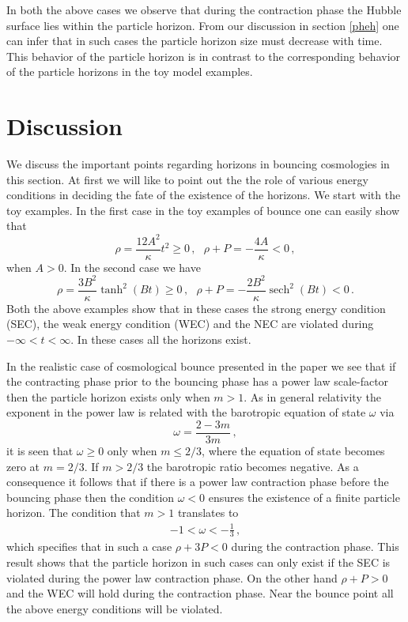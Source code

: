 \documentclass[24pt]{article}
\DeclareMathOperator{\sech}{sech}
\begin{document}
In both the above cases we observe that during the contraction phase
the Hubble surface lies within the particle horizon. From our
discussion in section \ref{pheh} one can infer that in such cases the
particle horizon size must decrease with time. This behavior of the
particle horizon is in contrast to the corresponding behavior of the
particle horizons in the toy model examples.
\section{Discussion}
\label{disc}

We discuss the important points regarding horizons in bouncing
cosmologies in this section. At first we will like to point out the
the role of various energy conditions in deciding the fate of the
existence of the horizons. We start with the toy examples.
In the first case in the toy examples of bounce one can easily show that
$$\rho=\frac{12A^2}{\kappa}t^2 \ge 0\,,\,\,\,\,\rho+P = -\frac{4A}{\kappa}
<0\,,$$ when $A>0$. In the second case we have
$$\rho=\frac{3B^2}{\kappa}\tanh^2(Bt) \ge 0\,,\,\,\,\,
\rho+P=-\frac{2B^2}{\kappa}\sech^2 (Bt) < 0\,.$$ Both the above
examples show that in these cases the strong energy condition (SEC),
the weak energy condition (WEC) and the NEC are violated during
$-\infty < t < \infty$.  In these cases all the horizons exist.

In the realistic case of cosmological bounce presented in the paper we
see that if the contracting phase prior to the bouncing phase has a
power law scale-factor then the particle horizon exists only when
$m>1$. As in general relativity the exponent in the power law is
related with the barotropic equation of state $\omega$ via
$$\omega=\frac{2-3m}{3m}\,,$$ it is seen that $\omega \ge 0$ only
when $m \le 2/3$, where the equation of state becomes zero at
$m=2/3$. If $m > 2/3$ the barotropic ratio becomes negative. As a
consequence it follows that if there is a power law contraction phase
before the bouncing phase then the condition $\omega<0$ ensures the
existence of a finite particle horizon. The condition that $m>1$
translates to
\begin{eqnarray}
-1< \omega < -\frac13\,,  
\label{secv}    
\end{eqnarray}  
which specifies that in such a case $\rho + 3P < 0$ during the
contraction phase. This result shows that the particle horizon in such
cases can only exist if the SEC is violated during the power law
contraction phase. On the other hand $\rho + P>0$ and the WEC will
hold during the contraction phase. Near the bounce point all the above
energy conditions will be violated.
\end{document}
